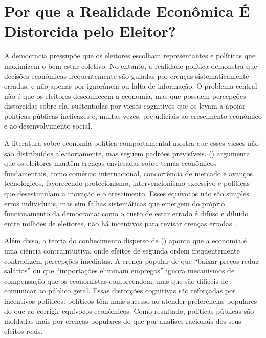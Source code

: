 \section{Por que a Realidade Econômica É Distorcida pelo Eleitor?} %

A democracia pressupõe que os eleitores escolham representantes e políticas que maximizem o bem-estar coletivo. No entanto, a realidade política demonstra que decisões econômicas frequentemente são guiadas por crenças sistematicamente erradas, e não apenas por ignorância ou falta de informação. O problema central não é que os eleitores desconhecem a economia, mas que possuem percepções distorcidas sobre ela, sustentadas por vieses cognitivos que os levam a apoiar políticas públicas ineficazes e, muitas vezes, prejudiciais ao crescimento econômico e ao desenvolvimento social.

A literatura sobre economia política comportamental mostra que esses vieses não são distribuídos aleatoriamente, mas seguem padrões previsíveis.  (\citeyear{The_Myth_of_the_Rational_Voter}) argumenta que os eleitores mantêm crenças enviesadas sobre temas econômicos fundamentais, como comércio internacional, concorrência de mercado e avanços tecnológicos, favorecendo protecionismo, intervencionismo excessivo e políticas que desestimulam a inovação e o crescimento. Esses equívocos não são simples erros individuais, mas sim falhas sistemáticas que emergem do próprio funcionamento da democracia: como o custo de estar errado é difuso e diluído entre milhões de eleitores, não há incentivos para revisar crenças erradas \cite{downs1957economic}.

Além disso, a teoria do conhecimento disperso de  (\citeyear{hayek_knowledge_use}) aponta que a economia é uma ciência contraintuitiva, onde efeitos de segunda ordem frequentemente contradizem percepções imediatas. A crença popular de que “baixar preços reduz salários” ou que “importações eliminam empregos” ignora mecanismos de compensação que os economistas compreendem, mas que são difíceis de comunicar ao público geral. Essas distorções cognitivas são reforçadas por incentivos políticos: políticos têm mais sucesso ao atender preferências populares do que ao corrigir equívocos econômicos. Como resultado, políticas públicas são moldadas mais por crenças populares do que por análises racionais dos seus efeitos reais.


